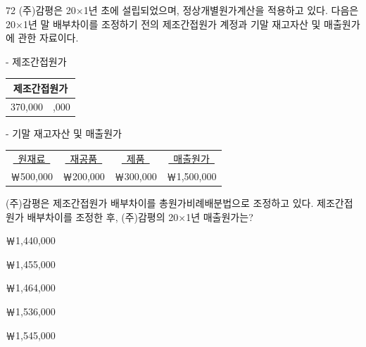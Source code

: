 \begin{question}{72}
(주)감평은 20×1년 초에 설립되었으며, 정상개별원가계산을 적용하고 있다. 다음은 20×1년 말 배부차이를 조정하기 전의 제조간접원가 계정과 기말 재고자산 및 매출원가에 관한 자료이다.
\begin{tcolorbox}[enhanced, colback=white, colframe=black, boxrule=0.4pt, arc=0pt, left=4pt, right=4pt, top=4pt, bottom=4pt]
- 제조간접원가
\begin{center}\small
\begin{tabular}{r|l}
\multicolumn{2}{c}{제조간접원가} \\ \hline
370,000\quad & \quad 310,000
\end{tabular}
\end{center}
- 기말 재고자산 및 매출원가
\begin{center}\small
\begin{tabular}{cccc}
\uline{\ 원재료\ } & \uline{\ 재공품\ } & \uline{\ 제품\ } & \uline{\ 매출원가\ } \\
￦500,000 & ￦200,000 & ￦300,000 & ￦1,500,000
\end{tabular}
\end{center}
\end{tcolorbox}
(주)감평은 제조간접원가 배부차이를 총원가비례배분법으로 조정하고 있다. 제조간접원가 배부차이를 조정한 후, (주)감평의 20×1년 매출원가는?
\begin{choices}
  \item ￦1,440,000
  \item ￦1,455,000
  \item ￦1,464,000
  \item ￦1,536,000
  \item ￦1,545,000
\end{choices}
\end{question}
